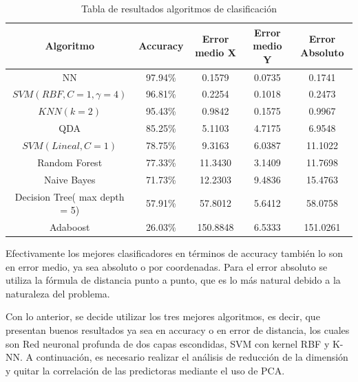 \begin{table}[ht!]
\centering
\caption[Tabla de resultados algoritmos de clasificación]{Tabla de resultados algoritmos de clasificación}
\label{tabla-clasificacion}
\begin{tabular}{|c|c|c|c|c|}
\hline
Algoritmo                     & Accuracy & Error medio X & Error medio Y & Error Absoluto \\ \hline
NN                            & 97.94\%  & 0.1579        & 0.0735        & 0.1741         \\ \hline
$SVM(RBF, C=1, \gamma = 4)$   & 96.81\%  & 0.2254        & 0.1018        & 0.2473         \\ \hline
$KNN(k = 2)$                  & 95.43\%  & 0.9842        & 0.1575        & 0.9967         \\ \hline
QDA                           & 85.25\%  & 5.1103        & 4.7175        & 6.9548         \\ \hline
$SVM(Lineal, C=1)$            & 78.75\%  & 9.3163        & 6.0387        & 11.1022        \\ \hline
Random Forest                 & 77.33\%  & 11.3430       & 3.1409        & 11.7698        \\ \hline
Naive Bayes                   & 71.73\%  & 12.2303       & 9.4836        & 15.4763        \\ \hline
Decision Tree( max depth = 5) & 57.91\%  & 57.8012       & 5.6412        & 58.0758        \\ \hline
Adaboost                      & 26.03\%  & 150.8848      & 6.5333        & 151.0261       \\ \hline
\end{tabular}
\end{table}


Efectivamente los mejores clasificadores en términos de accuracy también lo son en error medio, ya sea absoluto o por coordenadas. Para el error absoluto se utiliza la fórmula de distancia punto a punto, que es lo más natural debido a la naturaleza del problema.

Con lo anterior, se decide utilizar los tres mejores algoritmos, es decir, que presentan buenos resultados ya sea en accuracy o en error de distancia, los cuales son Red neuronal profunda de dos capas escondidas, SVM con kernel RBF y K-NN. A continuación, es necesario realizar el análisis de reducción de la dimensión y quitar la correlación de las predictoras mediante el uso de PCA.

